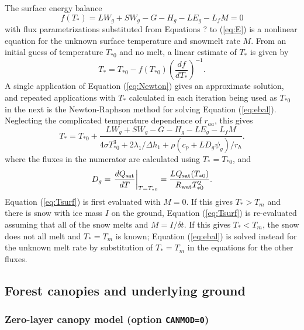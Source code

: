 \documentclass{article}
\begin{document}
The surface energy balance
\begin{equation}
f(T_*) = LW_g + SW_g - G - H_g - LE_g - L_fM = 0
\label{eq:ebal}
\end{equation}
with flux parametrizations substituted from Equations ? to (\ref{eq:E}) is a nonlinear equation for the unknown surface temperature and snowmelt rate $M$. From an initial guess of temperature $T_{*0}$ and no melt, a linear estimate of $T_*$ is given by
\begin{equation}
T_* = T_{*0} - f(T_{*0})\left(\frac{df}{dT_*}\right)^{-1}.
\label{eq:Newton}
\end{equation}
A single application of Equation (\ref{eq:Newton}) gives an approximate solution, and repeated applications with $T_*$ calculated in each iteration being used as $T_{*0}$ in the next is the Newton-Raphson method for solving Equation (\ref{eq:ebal}). Neglecting the complicated temperature dependence of $r_{aa}$, this gives
\begin{equation}
T_* = T_{*0} + \frac{LW_g + SW_g - G - H_g - LE_g - L_fM}
                    {4\sigma T_{*0}^3 + 2\lambda_1/\Delta h_1
                                      + \rho(c_p + LD_g\psi_g)/r_h}.
\label{eq:Tsurf}
\end{equation}
where the fluxes in the numerator are calculated using $T_* = T_{*0}$, and
\begin{equation}
D_g = \left.\frac{dQ_{\rm sat}}{dT}\right\rvert_{T=T_{*0}} 
    = \frac{LQ_{\rm sat}(T_{*0})}{R_{\rm wat}T_{*0}^2}.
\end{equation}
Equation (\ref{eq:Tsurf}) is first evaluated with $M=0$. If this gives $T_* > T_m$ and there is snow with ice mass $I$ on the ground, Equation (\ref{eq:Tsurf}) is re-evaluated assuming that all of the snow melts and $M = I / \delta t$. If this gives $T_* < T_m$, the snow does not all melt and $T_* = T_m$ is known; Equation (\ref{eq:ebal}) is solved instead for the unknown melt rate by substitution of $T_* = T_m$ in the equations for the other fluxes.

\subsection{Forest canopies and underlying ground}

\subsubsection{Zero-layer canopy model (option {\tt CANMOD=0})}
\end{document}
